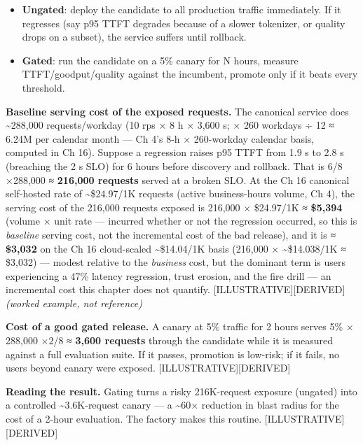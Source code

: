 \begin{itemize}
\tightlist
\item
  \textbf{Ungated}: deploy the candidate to all production traffic
  immediately. If it regresses (say p95 TTFT degrades because of a
  slower tokenizer, or quality drops on a subset), the service suffers
  until rollback.
\item
  \textbf{Gated}: run the candidate on a 5\% canary for N hours, measure
  TTFT/goodput/quality against the incumbent, promote only if it beats
  every threshold.
\end{itemize}


\textbf{Baseline serving cost of the exposed requests.} The canonical
service does \textasciitilde288,000 requests/workday (10 rps × 8 h ×
3,600 s; × 260 workdays ÷ 12 ≈ 6.24M per calendar month --- Ch 4's 8-h ×
260-workday calendar basis, computed in Ch 16). Suppose a regression
raises p95 TTFT from 1.9 s to 2.8 s (breaching the 2 s SLO) for 6 hours
before discovery and rollback. That is 6/8 ×288,000 ≈ \textbf{216,000
requests} served at a broken SLO. At the Ch 16 canonical self-hosted
rate of \textasciitilde\$24.97/1K requests (active business-hours
volume, Ch 4), the serving cost of the 216,000 requests exposed is
216,000 × \$24.97/1K ≈ \textbf{\$5,394} (volume × unit rate --- incurred
whether or not the regression occurred, so this is \emph{baseline}
serving cost, not the incremental cost of the bad release), and it is ≈
\textbf{\$3,032} on the Ch 16 cloud-scaled \textasciitilde\$14.04/1K
basis (216,000 × \textasciitilde\$14.038/1K ≈ \$3,032) --- modest
relative to the \emph{business} cost, but the dominant term is users
experiencing a 47\% latency regression, trust erosion, and the fire
drill --- an incremental cost this chapter does not quantify.
\mbox{{[}ILLUSTRATIVE{]}}\hspace{0pt}\mbox{{[}DERIVED{]}} \emph{(worked example, not reference)}

\textbf{Cost of a good gated release.} A canary at 5\% traffic for 2
hours serves 5\% × 288,000 ×2/8 ≈ \textbf{3,600 requests} through the
candidate while it is measured against a full evaluation suite. If it
passes, promotion is low-risk; if it fails, no users beyond canary were
exposed. \mbox{{[}ILLUSTRATIVE{]}}\hspace{0pt}\mbox{{[}DERIVED{]}}

\textbf{Reading the result.} Gating turns a risky 216K-request exposure
(ungated) into a controlled \textasciitilde3.6K-request canary --- a
\textasciitilde60× reduction in blast radius for the cost of a 2-hour
evaluation. The factory makes this routine.
\mbox{{[}ILLUSTRATIVE{]}}\hspace{0pt}\mbox{{[}DERIVED{]}}

